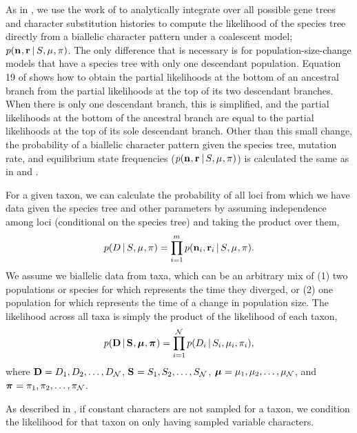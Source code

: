 As in \citet{Oaks2018ecoevolity},
we use the work of \citet{Bryant2012}
to analytically integrate over all possible gene trees and
character substitution histories to compute the likelihood
of the species tree directly from 
a biallelic character pattern under a coalescent model;
$\pr(\leafallelecounts, \leafredallelecounts \given \sptree, \murate, \gfreq)$.
The only difference that is necessary is for population-size-change models that
have a species tree with only one descendant population.
Equation 19 of \citet{Bryant2012} shows how to obtain the partial likelihoods
at the bottom of an ancestral branch from the partial likelihoods at the top of
its two descendant branches.
When there is only one descendant branch, this is simplified, and the partial
likelihoods at the bottom of the ancestral branch are equal to the partial
likelihoods at the top of its sole descendant branch.
Other than this small change, the probability of a biallelic character pattern
given the species tree, mutation rate, and equilibrium state frequencies
($\pr(\leafallelecounts, \leafredallelecounts \given \sptree, \murate, \gfreq)$)
is calculated the same as in \citet{Bryant2012} and \citet{Oaks2018ecoevolity}.


\begin{linenomath}
For a given taxon, we can calculate the probability of all \nloci{} loci
from which we have data given the species tree and other parameters by
assuming independence among loci (conditional on the species tree) and
taking the product over them,
\begin{equation}
    \pr(\comparisondata \given \sptree, \murate, \gfreq)
    =
    \prod_{i=1}^{\nloci}
    \pr(\leafallelecounts[i], \leafredallelecounts[i] \given \sptree, \murate, \gfreq).
    \label{eq:comparisonlikelihood}
\end{equation}
We assume we biallelic data from \ncomparisons{} taxa, which can be an
arbitrary mix of
(1) two populations or species for which \comparisondivtime represents
the time they diverged, or
(2) one population for which \comparisondivtime represents the time
of a change in population size.
The likelihood across all \ncomparisons{} taxa is simply the product of the
likelihood of each taxon,
\begin{equation}
    \pr(
    \alldata
    \given
    \sptrees,
    \murates,
    \gfreqs)
    =
    \prod_{i=1}^{\ncomparisons}
    \pr(\comparisondata[i] \given \sptree[i], \murate[i], \gfreq[i]),
    \label{eq:collectionlikelihood}
\end{equation}
where
$\alldata = \comparisondata[1], \comparisondata[2], \ldots, \comparisondata[\ncomparisons]$,
$\sptrees = \sptree[1], \sptree[2], \ldots, \sptree[\ncomparisons]$,
$\murates = \murate[1], \murate[2], \ldots, \murate[\ncomparisons]$,
and
$\gfreqs = \gfreq[1], \gfreq[2], \ldots, \gfreq[\ncomparisons]$.
\end{linenomath}
As described in \citet{Oaks2018ecoevolity},
if constant characters are not sampled for a taxon, we condition the likelihood
for that taxon on only having sampled variable characters.


